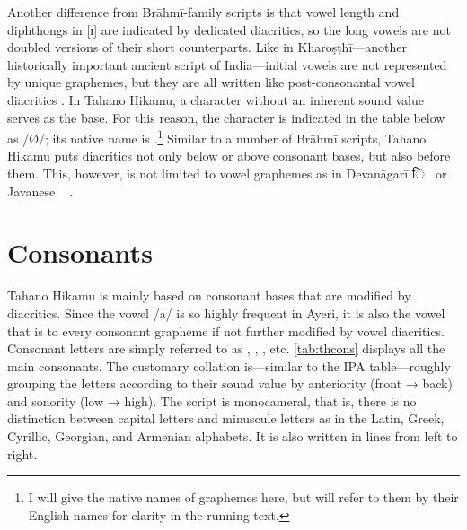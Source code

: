 Another difference from Brāhmī-family scripts is that vowel length and
diphthongs in [ɪ] are indicated by dedicated diacritics, so the long vowels are
not doubled versions of their short counterparts. Like in Kharoṣṭhī---another
historically important ancient script of India---initial vowels are not
represented by unique graphemes, but they are all written like post-consonantal
vowel diacritics \citep[377]{salomon1996}. In Tahano Hikamu, a character
without an inherent sound value serves as the base. For this reason, the
character is indicated in the table below as  /Ø/; its native name is
.\footnote{I will give the native names of
graphemes here, but will refer to them by their English names for clarity in
the running text.} Similar to a number of Brāhmī scripts, Tahano Hikamu puts
diacritics not only below or above consonant bases, but also before them. This,
however, is not limited to vowel graphemes as in Devanāgarī {\FS ि}~ or
Javanese ~ \citep[478]{kuipersmcdermott1996}.

\section{Consonants}

Tahano Hikamu is mainly based on consonant bases that are modified by
diacritics. Since the vowel /a/ is so highly frequent in Ayeri, it is also the
vowel that is  to every consonant grapheme if not further modified
by vowel diacritics. Consonant letters are simply referred to as ,
, , etc. \autoref{tab:thcons} displays all the main consonants.
The customary collation is---similar to the IPA table---roughly grouping the
letters according to their sound value by anteriority (front → back) and
sonority (low → high). The script is monocameral, that is, there is no
distinction between capital letters and minuscule letters as in the Latin,
Greek, Cyrillic, Georgian, and Armenian alphabets. It is also written in lines
from left to right.


